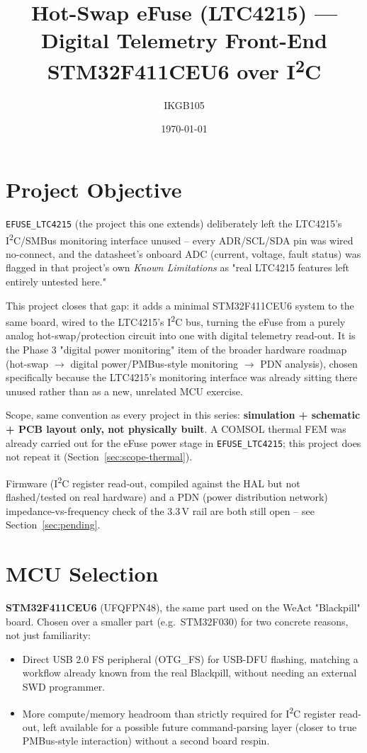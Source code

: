 \documentclass[11pt]{article}
\title{Hot-Swap eFuse (LTC4215) --- Digital Telemetry Front-End \\ \large STM32F411CEU6 over I\textsuperscript{2}C}
\author{IKGB105}
\date{\today}
\begin{document}
\maketitle

\section{Project Objective}

\texttt{EFUSE\_LTC4215} (the project this one extends) deliberately left the LTC4215's
I\textsuperscript{2}C/SMBus monitoring interface unused -- every ADR/SCL/SDA pin was wired
no-connect, and the datasheet's onboard ADC (current, voltage, fault status) was flagged in that
project's own \emph{Known Limitations} as "real LTC4215 features left entirely untested here."

This project closes that gap: it adds a minimal STM32F411CEU6 system to the same board, wired to
the LTC4215's I\textsuperscript{2}C bus, turning the eFuse from a purely analog hot-swap/protection
circuit into one with digital telemetry read-out. It is the Phase 3 "digital power monitoring" item
of the broader hardware roadmap (hot-swap $\to$ digital power/PMBus-style monitoring $\to$ PDN
analysis), chosen specifically because the LTC4215's monitoring interface was already sitting there
unused rather than as a new, unrelated MCU exercise.

Scope, same convention as every project in this series: \textbf{simulation + schematic + PCB layout
only, not physically built}. A COMSOL thermal FEM was already carried out for the eFuse power stage
in \texttt{EFUSE\_LTC4215}; this project does not repeat it (Section~\ref{sec:scope-thermal}).

\begin{pending}
Firmware (I\textsuperscript{2}C register read-out, compiled against the HAL but not flashed/tested
on real hardware) and a PDN (power distribution network) impedance-vs-frequency check of the 3.3\,V
rail are both still open -- see Section~\ref{sec:pending}.
\end{pending}

\section{MCU Selection}

\textbf{STM32F411CEU6} (UFQFPN48), the same part used on the WeAct "Blackpill" board. Chosen over a
smaller part (e.g.\ STM32F030) for two concrete reasons, not just familiarity:
\begin{itemize}
\item Direct USB 2.0 FS peripheral (OTG\_FS) for USB-DFU flashing, matching a workflow already known
  from the real Blackpill, without needing an external SWD programmer.
\item More compute/memory headroom than strictly required for I\textsuperscript{2}C register
  read-out, left available for a possible future command-parsing layer (closer to true PMBus-style
  interaction) without a second board respin.
\end{itemize}
\end{document}
